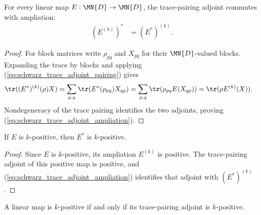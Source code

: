 \begin{theorem}
    \label{thm:trace_pairing_adjoint_ampliation}
    \leanok
    For every linear map $E : \MN{D}\to\MN{D}$, the trace-pairing adjoint
    commutes with ampliation:
    \begin{align}
        (E^{(k)})^*
         & =(E^*)^{(k)}.
        \label{eq:schwarz_trace_adjoint_ampliation}
    \end{align}
\end{theorem}

\begin{proof}
    \leanok
    For block matrices write $\rho_{pq}$ and $X_{pq}$ for their
    $\MN{D}$-valued blocks. Expanding the trace by blocks and applying
    (\ref{eq:schwarz_trace_adjoint_pairing}) gives
    \begin{align}
        \tr((E^*)^{(k)}(\rho)X)
         & =\sum_{p,q}\tr(E^*(\rho_{pq})X_{qp})
        =\sum_{p,q}\tr(\rho_{pq}E(X_{qp}))
        =\tr(\rho E^{(k)}(X)).
        \notag
    \end{align}
    Nondegeneracy of the trace pairing identifies the two adjoints, proving
    (\ref{eq:schwarz_trace_adjoint_ampliation}).
\end{proof}

\begin{theorem}
    \label{thm:k_positive_trace_pairing_adjoint}
    \leanok
    If $E$ is $k$-positive, then $E^*$ is $k$-positive.
\end{theorem}

\begin{proof}
    \leanok
    Since $E$ is $k$-positive, its ampliation $E^{(k)}$ is positive. The
    trace-pairing adjoint of this positive map is positive, and
    (\ref{eq:schwarz_trace_adjoint_ampliation}) identifies that adjoint with
    $(E^*)^{(k)}$.
\end{proof}

\begin{theorem}
    \label{thm:k_positive_trace_pairing_adjoint_iff}
    \leanok
    A linear map is $k$-positive if and only if its trace-pairing adjoint is
    $k$-positive.
\end{theorem}

